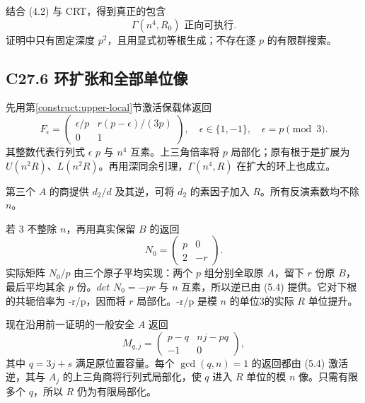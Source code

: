 \documentclass[11pt,a4paper]{article}
\theoremstyle{definition}
\numberwithin{equation}{section}
\begin{document}
{结合} {(4.2)} {与} {CRT，得到真正的包含} \[
\boxed{\Gamma(n^4,R_0)\text{ 正向可执行}.}
\tag{C27.5.4}
\] {证明中只有固定深度} {\ensuremath{p^{2}}，且用显式初等根生成；不存在逐} {\ensuremath{p}} {的有限群搜索。}

\subsection*{\texorpdfstring{{C27.6} {环扩张和全部单位像}}{C27.6 环扩张和全部单位像}}\label{C27-h173}

{先用}第\ref{construct:upper-local}节{激活保载体返回} \[
F_\epsilon=
\begin{pmatrix}
\epsilon/p&r(p-\epsilon)/(3p)\\
0&1
\end{pmatrix},
\quad\epsilon\in\{1,-1\},\quad\epsilon=p\pmod3.
\] {其整数代表行列式} {\ensuremath{\epsilon }} {\ensuremath{p}} {与} {\ensuremath{n^{4}}} {互素。上三角倍率将} {\ensuremath{p}} {局部化；原有根于是扩展为} {\ensuremath{U(n^{2}R)}、\ensuremath{L(n^{2}R)}。再用深同余引理，\ensuremath{\Gamma (n^{4},R)}} {在扩大的环上也成立。}

{第三个} {\ensuremath{A}} {的商提供} {\ensuremath{d_{2}/d}} {及其逆，可将} {\ensuremath{d_{2}}} {的素因子加入} {\ensuremath{R}。所有反演素数均不除} {\ensuremath{n}。}

{若} {3} {不整除} {\ensuremath{n}，再用真实保留} {\ensuremath{B}} {的返回} \[
N_0=\begin{pmatrix}p&0\\2&-r\end{pmatrix}.
\] {实际矩阵} {\ensuremath{N_{0}/p}} {由三个原子平均实现：两个} {\ensuremath{p}} {组分别全取原} {\ensuremath{A}，留下} {\ensuremath{r}} {份原} {\ensuremath{B}，最后平均其余} {\ensuremath{p}} {份。\ensuremath{det}} {\ensuremath{N_{0}=-pr}} {与} {\ensuremath{n}} {互素，所以逆已由} {(5.4)} {提供。它对下根的共轭倍率为} {-r/p，因而将} {\ensuremath{r}} {局部化。-r/p} {是模} {\ensuremath{n}} {的单位3的实际} {\ensuremath{R}} {单位提升。}

{现在沿用前一证明的一般安全} {\ensuremath{A}} {返回} \[
M_{q,j}=\begin{pmatrix}p-q&nj-pq\\-1&0\end{pmatrix},
\] {其中} {\ensuremath{q=3j+s}} {满足原位置容量。每个} {\ensuremath{\operatorname{gcd}(q,n)=1}} {的返回都由} {(5.4)} {激活逆，其与} {\ensuremath{A_{j}}} {的上三角商将行列式局部化，使} {\ensuremath{q}} {进入} {\ensuremath{R}} {单位的模} {\ensuremath{n}} {像。只需有限多个} {\ensuremath{q}，所以} {\ensuremath{R}} {仍为有限局部化。}
\end{document}

